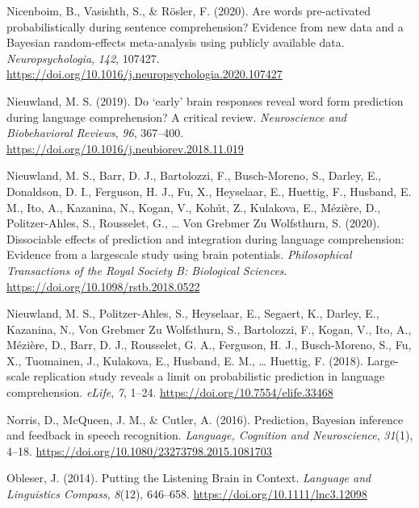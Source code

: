 \documentclass[a4paper, nobind]{templates/ociamthesis}
\newlength{\cslhangindent}
\newenvironment{CSLReferences}[2] %
 {%
  \setlength{\parindent}{0pt}
  \ifodd #1
  \let\oldpar\par
  \def\par{\hangindent=\cslhangindent\oldpar}
  \fi
  \setlength{\parskip}{1mm}
  \setlength{\baselineskip}{6mm}
 }%
 {}
\begin{document}
\begin{CSLReferences}{1}{0}
\leavevmode{}%
Nicenboim, B., Vasishth, S., \& Rösler, F. (2020). Are words pre-activated probabilistically during sentence comprehension? Evidence from new data and a Bayesian random-effects meta-analysis using publicly available data. \emph{Neuropsychologia}, \emph{142}, 107427. \url{https://doi.org/10.1016/j.neuropsychologia.2020.107427}

\leavevmode{}%
Nieuwland, M. S. (2019). {Do `early' brain responses reveal word form prediction during language comprehension? A critical review}. \emph{Neuroscience and Biobehavioral Reviews}, \emph{96}, 367--400. \url{https://doi.org/10.1016/j.neubiorev.2018.11.019}

\leavevmode{}%
Nieuwland, M. S., Barr, D. J., Bartolozzi, F., Busch-Moreno, S., Darley, E., Donaldson, D. I., Ferguson, H. J., Fu, X., Heyselaar, E., Huettig, F., Husband, E. M., Ito, A., Kazanina, N., Kogan, V., Kohút, Z., Kulakova, E., Mézière, D., Politzer-Ahles, S., Rousselet, G., \ldots{} Von Grebmer Zu Wolfsthurn, S. (2020). {Dissociable effects of prediction and integration during language comprehension: Evidence from a largescale study using brain potentials}. \emph{Philosophical Transactions of the Royal Society B: Biological Sciences}. \url{https://doi.org/10.1098/rstb.2018.0522}

\leavevmode{}%
Nieuwland, M. S., Politzer-Ahles, S., Heyselaar, E., Segaert, K., Darley, E., Kazanina, N., Von Grebmer Zu Wolfsthurn, S., Bartolozzi, F., Kogan, V., Ito, A., Mézière, D., Barr, D. J., Rousselet, G. A., Ferguson, H. J., Busch-Moreno, S., Fu, X., Tuomainen, J., Kulakova, E., Husband, E. M., \ldots{} Huettig, F. (2018). {Large-scale replication study reveals a limit on probabilistic prediction in language comprehension}. \emph{eLife}, \emph{7}, 1--24. \url{https://doi.org/10.7554/elife.33468}

\leavevmode{}%
Norris, D., McQueen, J. M., \& Cutler, A. (2016). {Prediction, Bayesian inference and feedback in speech recognition}. \emph{Language, Cognition and Neuroscience}, \emph{31}(1), 4--18. \url{https://doi.org/10.1080/23273798.2015.1081703}

\leavevmode{}%
Obleser, J. (2014). Putting the Listening Brain in Context. \emph{Language and Linguistics Compass}, \emph{8}(12), 646--658. \url{https://doi.org/10.1111/lnc3.12098}


\end{CSLReferences}
\end{document}
